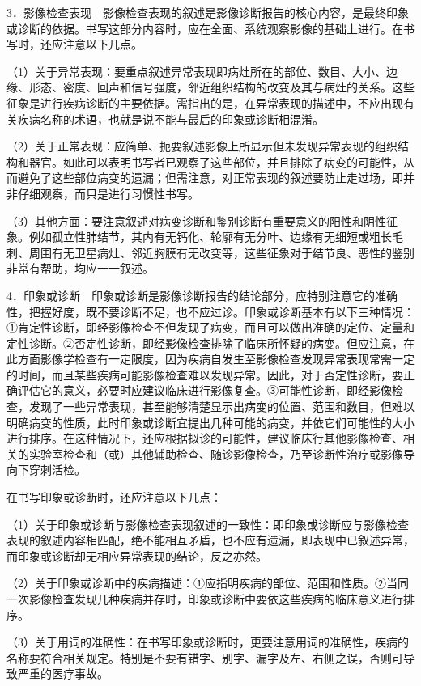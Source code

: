 3．影像检查表现　影像检查表现的叙述是影像诊断报告的核心内容，是最终印象或诊断的依据。书写这部分内容时，应在全面、系统观察影像的基础上进行。在书写时，还应注意以下几点。

（1）关于异常表现：要重点叙述异常表现即病灶所在的部位、数目、大小、边缘、形态、密度、回声和信号强度，邻近组织结构的改变及其与病灶的关系。这些征象是进行疾病诊断的主要依据。需指出的是，在异常表现的描述中，不应出现有关疾病名称的术语，也就是说不能与最后的印象或诊断相混淆。

（2）关于正常表现：应简单、扼要叙述影像上所显示但未发现异常表现的组织结构和器官。如此可以表明书写者已观察了这些部位，并且排除了病变的可能性，从而避免了这些部位病变的遗漏；但需注意，对正常表现的叙述要防止走过场，即并非仔细观察，而只是进行习惯性书写。

（3）其他方面：要注意叙述对病变诊断和鉴别诊断有重要意义的阳性和阴性征象。例如孤立性肺结节，其内有无钙化、轮廓有无分叶、边缘有无细短或粗长毛刺、周围有无卫星病灶、邻近胸膜有无改变等，这些征象对于结节良、恶性的鉴别非常有帮助，均应一一叙述。

4．印象或诊断　印象或诊断是影像诊断报告的结论部分，应特别注意它的准确性，把握好度，既不要诊断不足，也不应过诊。印象或诊断基本有以下三种情况：①肯定性诊断，即经影像检查不但发现了病变，而且可以做出准确的定位、定量和定性诊断。②否定性诊断，即经影像检查排除了临床所怀疑的病变。但应注意，在此方面影像学检查有一定限度，因为疾病自发生至影像检查发现异常表现常需一定的时间，而且某些疾病可能影像检查难以发现异常。因此，对于否定性诊断，要正确评估它的意义，必要时应建议临床进行影像复查。③可能性诊断，即经影像检查，发现了一些异常表现，甚至能够清楚显示出病变的位置、范围和数目，但难以明确病变的性质，此时印象或诊断宜提出几种可能的病变，并依它们可能性的大小进行排序。在这种情况下，还应根据拟诊的可能性，建议临床行其他影像检查、相关的实验室检查和（或）其他辅助检查、随诊影像检查，乃至诊断性治疗或影像导向下穿刺活检。

在书写印象或诊断时，还应注意以下几点：

（1）关于印象或诊断与影像检查表现叙述的一致性：即印象或诊断应与影像检查表现的叙述内容相匹配，绝不能相互矛盾，也不应有遗漏，即表现中已叙述异常，而印象或诊断却无相应异常表现的结论，反之亦然。

（2）关于印象或诊断中的疾病描述：①应指明疾病的部位、范围和性质。②当同一次影像检查发现几种疾病并存时，印象或诊断中要依这些疾病的临床意义进行排序。

（3）关于用词的准确性：在书写印象或诊断时，更要注意用词的准确性，疾病的名称要符合相关规定。特别是不要有错字、别字、漏字及左、右侧之误，否则可导致严重的医疗事故。

